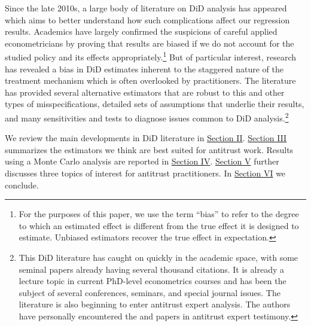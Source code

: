 \documentclass[12pt]{article}
\begin{document}
Since the late 2010s, a large body of literature on DiD analysis has appeared which aims to better understand how such complications affect our regression results. Academics have largely confirmed the suspicions of careful applied econometricians by proving that results are biased if we do not account for the studied policy and its effects appropriately.\footnote{For the purposes of this paper, we use the term ``bias'' to refer to the degree to which an estimated effect is different from the true effect it is designed to estimate. Unbiased estimators recover the true effect in expectation.} But of particular interest, research has revealed a bias in DiD estimates inherent to the staggered nature of the treatment mechanism which is often overlooked by practitioners. The literature has provided several alternative estimators that are robust to this and other types of misspecifications, detailed sets of assumptions that underlie their results, and many sensitivities and tests to diagnose issues common to DiD analysis.\footnote{This DiD literature has caught on quickly in the academic space, with some seminal papers already having several thousand citations. It is already a lecture topic in current PhD-level econometrics courses and has been the subject of several conferences, seminars, and special journal issues. The literature is also beginning to enter antitrust expert analysis. The authors have personally encountered the \citet{CS2021} and \citet{goodman-bacon2021a} papers in antitrust expert testimony.}

We review the main developments in DiD literature in \hyperref[sec:literature]{Section II}. \hyperref[sec:analysis]{Section III} summarizes the estimators we think are best suited for antitrust work. Results using a Monte Carlo analysis are reported in \hyperref[sec:analysis]{Section IV}. \hyperref[sec:antitrust]{Section V} further discusses three topics of interest for antitrust practitioners. In \hyperref[sec:conclusion]{Section VI} we conclude.
\end{document}
